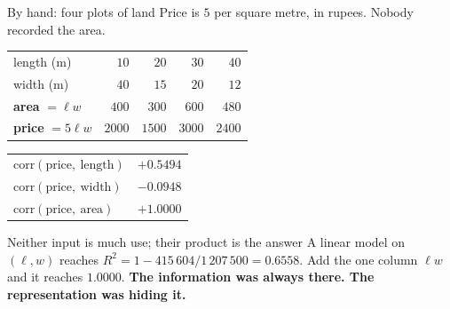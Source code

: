 \documentclass[aspectratio=169]{beamer}
\begin{document}
\begin{frame}[shrink=6]{By hand: four plots of land}
  Price is $5$ per square metre, in rupees. Nobody recorded the area.
  \begin{center}\small
  \begin{tabular}{@{}lrrrr@{}}
    \toprule
    length (m) & $10$ & $20$ & $30$ & $40$\\
    width (m)  & $40$ & $15$ & $20$ & $12$\\
    \midrule
    \textbf{area} $=\ell w$ & $400$ & $300$ & $600$ & $480$\\
    \textbf{price} $=5\ell w$ & $2000$ & $1500$ & $3000$ & $2400$\\
    \bottomrule
  \end{tabular}
  \end{center}
  \vspace{0.2em}
  \begin{center}\small
  \begin{tabular}{@{}lr@{}}
    \toprule
    $\mathrm{corr}(\text{price},\ \text{length})$ & $+0.5494$\\
    $\mathrm{corr}(\text{price},\ \text{width})$  & $-0.0948$\\
    $\mathrm{corr}(\text{price},\ \text{area})$   & $\mathbf{+1.0000}$\\
    \bottomrule
  \end{tabular}
  \end{center}
  \begin{alertblock}{Neither input is much use; their product is the answer}
    \small A linear model on $(\ell, w)$ reaches
    $R^2 = 1 - 415\,604/1\,207\,500 = 0.6558$. Add the one
    column $\ell w$ and it reaches $1.0000$. \textbf{The information was
    always there. The representation was hiding it.}
  \end{alertblock}
\end{frame}
\end{document}
